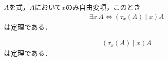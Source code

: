 	\begin{screen}
		$A$を式，$A$において$x$のみ自由変項，このとき
		\begin{align}
			\exists x\ A \Longleftrightarrow \left( \tau_x(A) \mid x \right) A
		\end{align}
		は定理である．
	\end{screen}
	
	\begin{screen}
		\begin{align}
			\left( \tau_x(A) \mid x \right) A
		\end{align}
		は定理である．
	\end{screen}